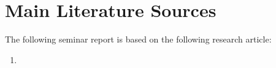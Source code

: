 
\section*{Main Literature Sources}

The following seminar report is based on the following research article:

\begin{enumerate}
	\item {}
\end{enumerate}

